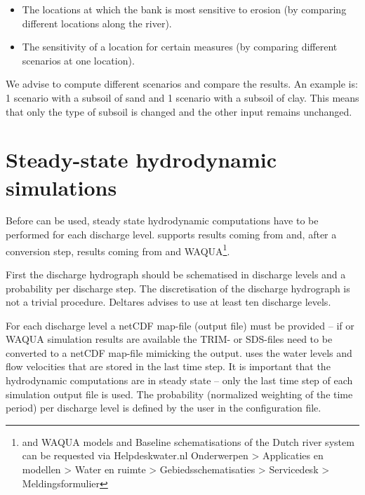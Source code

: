 \begin{itemize}
\item The locations at which the bank is most sensitive to erosion (by comparing different locations along the river).
\item The sensitivity of a location for certain measures (by comparing different scenarios at one location).
\end{itemize}

We advise to compute different scenarios and compare the results.
An example is: 1 scenario with a subsoil of sand and 1 scenario with a subsoil of clay.
This means that only the type of subsoil is changed and the other input remains unchanged.

\section{Steady-state hydrodynamic simulations}

Before \dfastbe can be used, steady state hydrodynamic computations have to be performed for each discharge level.
\dfastbe supports results coming from \dflowfm and, after a conversion step, results coming from \dflow and WAQUA\footnote{\dflowfm and WAQUA models and Baseline schematisations of the Dutch river system can be requested via Helpdeskwater.nl Onderwerpen > Applicaties en modellen > Water en ruimte > Gebiedsschematisaties > Servicedesk > Meldingsformulier}.

First the discharge hydrograph should be schematised in discharge levels and a probability per discharge step.
The discretisation of the discharge hydrograph is not a trivial procedure. Deltares advises to use at least ten discharge levels.

For each discharge level a netCDF map-file (\dflowfm output file) must be provided -- if \dflow or WAQUA simulation results are available the TRIM- or SDS-files need to be converted to a netCDF map-file mimicking the \dflowfm output.
\dfastbe uses the water levels and flow velocities that are stored in the last time step.
It is important that the hydrodynamic computations are in steady state -- only the last time step of each simulation output file is used.
The probability (normalized weighting of the time period) per discharge level is defined by the user in the configuration file.



